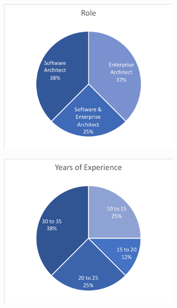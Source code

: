 \begin{figure}
   \begin{subfigure}{.5\linewidth}
      \centering
      \includegraphics[scale=0.75, trim=5 5 5 5,clip]{Figures/prioritisation-roles}
   \end{subfigure}
   \begin{subfigure}{.5\linewidth}
      \centering
      \includegraphics[scale=0.75, trim=5 5 5 5,clip]{Figures/prioritisation-yearsexp}

\end{subfigure}
\end{figure}
